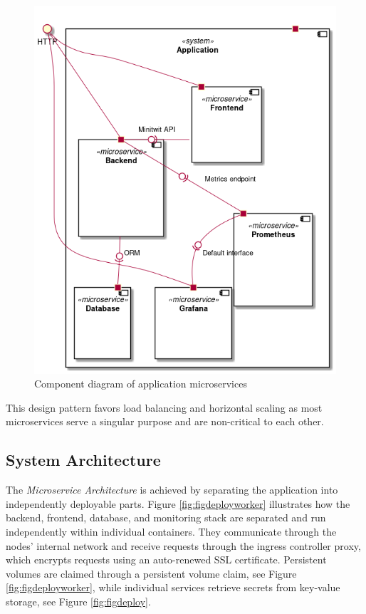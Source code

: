\begin{figure}[H]
    \centering
    \includegraphics[scale=.43]{images/microservices-components.png}
    \caption{Component diagram of application microservices}
    \label{fig:microservices}
\end{figure}

This design pattern favors load balancing and horizontal scaling as most microservices serve a singular purpose and are non-critical to each other.

\subsection{System Architecture}
\label{subsec:system_architecture}
The \textit{Microservice Architecture} is achieved by separating the application into independently deployable parts. Figure \ref{fig:figdeployworker} illustrates how the backend, frontend, database, and monitoring stack are separated and run independently within individual containers. 
They communicate through the nodes' internal network and receive requests through the ingress controller proxy, which encrypts requests using an auto-renewed SSL certificate. 
Persistent volumes are claimed through a persistent volume claim, see Figure \ref{fig:figdeployworker}, while individual services retrieve secrets from key-value storage, see  Figure \ref{fig:figdeploy}.

